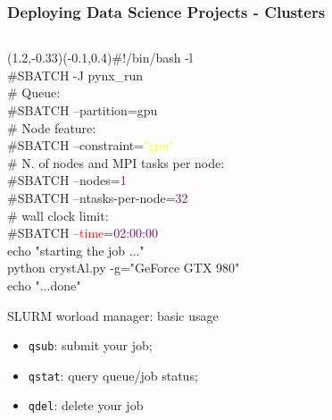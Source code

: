 \documentclass[]{beamer}
\begin{document}
\begin{frame}
\frametitle{Deploying Data Science Projects - Clusters}

\begin{columns}

    \begin{column}{0.65\textwidth}
        \ttfamily\scriptsize
            (1.2,-0.33)(-0.1,0.4)\#$!$/bin/bash -l\\
            \#SBATCH -J pynx\_run \\
            \# Queue:\\
            \#SBATCH --partition=gpu\\
            \# Node feature:\\
            \#SBATCH --constraint=\textcolor{yellow}{"gpu"}\\
            
            \# N. of nodes and MPI tasks per node:\\
            \#SBATCH --nodes=\textcolor{purple}{1}\\
            \#SBATCH --ntasks-per-node=\textcolor{purple}{32}\\
            \# wall clock limit:\\
            \#SBATCH --\textcolor{red}{time}=\textcolor{purple}{02:00:00} \\

            echo "starting the job ..."\\
            python crystAl.py -g="GeForce GTX 980"\\
            echo "...done"
        \begin{block}{SLURM worload manager: basic usage}
        \begin{itemize}
            \item \small \texttt{qsub}: submit your job;
            \item \small \texttt{qstat}: query queue/job status;
            \item \small \texttt{qdel}: delete your job 
        \end{itemize}
        \end{block}
    \end{column}


\end{columns}
\end{frame}
\end{document}
